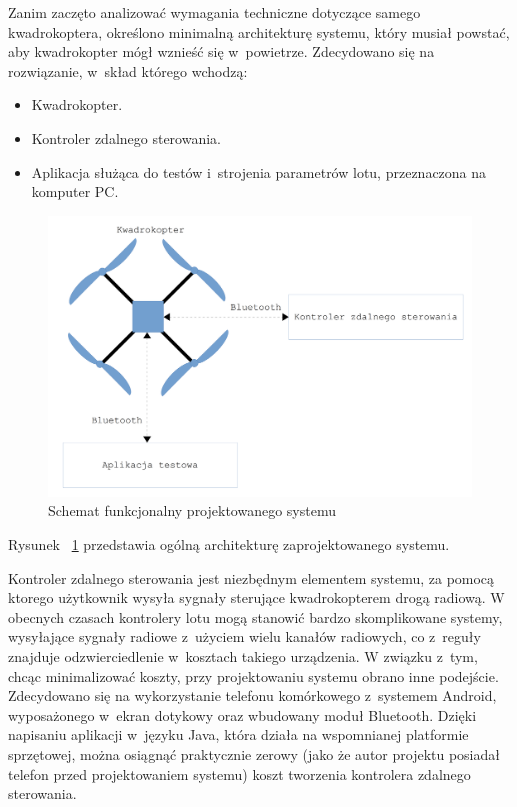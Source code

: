 \documentclass[11pt, twoside]{Thesis} %
\begin{document}
Zanim zaczęto analizować wymagania techniczne dotyczące samego kwadrokoptera, określono minimalną architekturę systemu, który musiał powstać, aby kwadrokopter mógł wznieść się w~powietrze. Zdecydowano się na rozwiązanie, w~skład którego wchodzą:

\begin{itemize}
	\item Kwadrokopter.
	\item Kontroler zdalnego sterowania.
	\item Aplikacja służąca do testów i~strojenia parametrów lotu, przeznaczona na komputer PC.
\end{itemize}

\begin{figure}[H]
	\centering
	\includegraphics[scale=0.1]{Pictures/SchematSystemu.png}
	\caption[Schemat blokowy systemu]{Schemat funkcjonalny projektowanego systemu}
	\label{fig:SchematSystemu}
\end{figure}



Rysunek ~\ref{fig:SchematSystemu} przedstawia ogólną architekturę zaprojektowanego systemu.

Kontroler zdalnego sterowania jest niezbędnym elementem systemu, za pomocą ktorego użytkownik wysyła sygnały sterujące kwadrokopterem drogą radiową. W obecnych czasach kontrolery lotu mogą stanowić bardzo skomplikowane systemy, wysyłające sygnały radiowe z~użyciem wielu kanałów radiowych, co z~reguły znajduje odzwierciedlenie w~kosztach takiego urządzenia. W związku z~tym, chcąc minimalizować koszty, przy projektowaniu systemu obrano inne podejście. Zdecydowano się na wykorzystanie telefonu komórkowego z~systemem Android, wyposażonego w~ekran dotykowy oraz wbudowany moduł Bluetooth. Dzięki napisaniu aplikacji w~języku Java, która działa na wspomnianej platformie sprzętowej, można osiągnąć praktycznie zerowy (jako że autor projektu posiadał telefon przed projektowaniem systemu) koszt tworzenia kontrolera zdalnego sterowania. 
\end{document}
